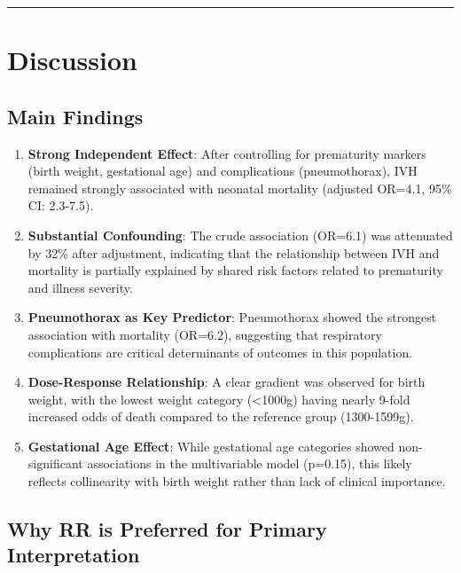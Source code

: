 \documentclass[
]{article}
\begin{document}
\begin{center}\rule{0.5\linewidth}{0.5pt}\end{center}

\hypertarget{discussion}{%
\section{Discussion}\label{discussion}}

\hypertarget{main-findings}{%
\subsection{Main Findings}\label{main-findings}}

\begin{enumerate}
\def\labelenumi{\arabic{enumi}.}
\item
  \textbf{Strong Independent Effect}: After controlling for prematurity
  markers (birth weight, gestational age) and complications
  (pneumothorax), IVH remained strongly associated with neonatal
  mortality (adjusted OR=4.1, 95\% CI: 2.3-7.5).
\item
  \textbf{Substantial Confounding}: The crude association (OR=6.1) was
  attenuated by 32\% after adjustment, indicating that the relationship
  between IVH and mortality is partially explained by shared risk
  factors related to prematurity and illness severity.
\item
  \textbf{Pneumothorax as Key Predictor}: Pneumothorax showed the
  strongest association with mortality (OR=6.2), suggesting that
  respiratory complications are critical determinants of outcomes in
  this population.
\item
  \textbf{Dose-Response Relationship}: A clear gradient was observed for
  birth weight, with the lowest weight category (\textless1000g) having
  nearly 9-fold increased odds of death compared to the reference group
  (1300-1599g).
\item
  \textbf{Gestational Age Effect}: While gestational age categories
  showed non-significant associations in the multivariable model
  (p=0.15), this likely reflects collinearity with birth weight rather
  than lack of clinical importance.
\end{enumerate}

\hypertarget{why-rr-is-preferred-for-primary-interpretation}{%
\subsection{Why RR is Preferred for Primary
Interpretation}\label{why-rr-is-preferred-for-primary-interpretation}}
\end{document}
